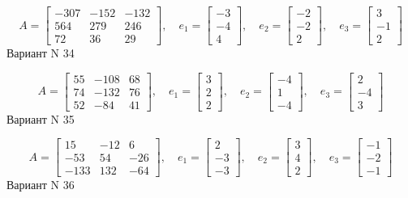 \documentclass[11pt]{report}
\begin{document}
$$A = \left[\begin{matrix}-307 & -152 & -132\\564 & 279 & 246\\72 & 36 & 29\end{matrix}\right],\quad e_1 = \left[\begin{matrix}-3\\-4\\4\end{matrix}\right],\quad e_2 = \left[\begin{matrix}-2\\-2\\2\end{matrix}\right],\quad e_3 = \left[\begin{matrix}3\\-1\\2\end{matrix}\right]$$Вариант N 34

$$A = \left[\begin{matrix}55 & -108 & 68\\74 & -132 & 76\\52 & -84 & 41\end{matrix}\right],\quad e_1 = \left[\begin{matrix}3\\2\\2\end{matrix}\right],\quad e_2 = \left[\begin{matrix}-4\\1\\-4\end{matrix}\right],\quad e_3 = \left[\begin{matrix}2\\-4\\3\end{matrix}\right]$$Вариант N 35

$$A = \left[\begin{matrix}15 & -12 & 6\\-53 & 54 & -26\\-133 & 132 & -64\end{matrix}\right],\quad e_1 = \left[\begin{matrix}2\\-3\\-3\end{matrix}\right],\quad e_2 = \left[\begin{matrix}3\\4\\2\end{matrix}\right],\quad e_3 = \left[\begin{matrix}-1\\-2\\-1\end{matrix}\right]$$Вариант N 36
\end{document}
